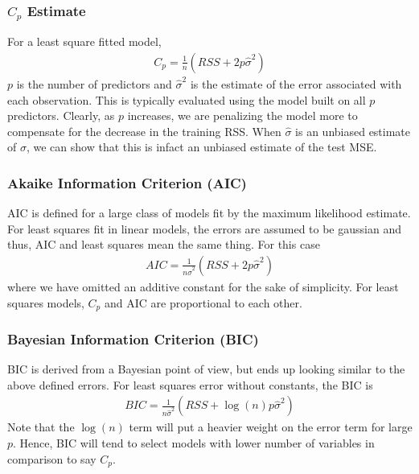 \documentclass[11pt, a4paper]{article}
\begin{document}
    \subsubsection{$C_{p}$ Estimate}
    For a least square fitted model,
    \begin{align*}
        C_{p} = \frac{1}{n}(RSS + 2p\hat{\sigma}^{2})
    \end{align*}
    $p$ is the number of predictors and $\hat{\sigma}^{2}$ is the estimate of the error associated with each observation. This is typically evaluated using the model built on all $p$ predictors.\newline
    Clearly, as $p$ increases, we are penalizing the model more to compensate for the decrease in the training RSS. When $\hat{\sigma}$ is an unbiased estimate of $\sigma$, we can show that this is infact an unbiased estimate of the test MSE.


    \subsubsection{Akaike Information Criterion (AIC)}
    AIC is defined for a large class of models fit by the maximum likelihood estimate.\newline
    For least squares fit in linear models, the errors are assumed to be gaussian and thus, AIC and least squares mean the same thing. For this case
    \begin{align*}
        AIC = \frac{1}{n\hat{\sigma}^2}(RSS + 2p\hat{\sigma}^2)
    \end{align*}
    where we have omitted an additive constant for the sake of simplicity.\newline
    For least squares models, $C_{p}$ and AIC are proportional to each other.


    \subsubsection{Bayesian Information Criterion (BIC)}
    BIC is derived from a Bayesian point of view, but ends up looking similar to the above defined errors.\newline
    For least squares error without constants, the BIC is
    \begin{align*}
        BIC = \frac{1}{n\hat{\sigma}^{2}} (RSS + \log(n)p\hat{\sigma}^{2})
    \end{align*}
    Note that the $\log(n)$ term will put a heavier weight on the error term for large $p$. Hence, BIC will tend to select models with lower number of variables in comparison to say $C_{p}$.
\end{document}
